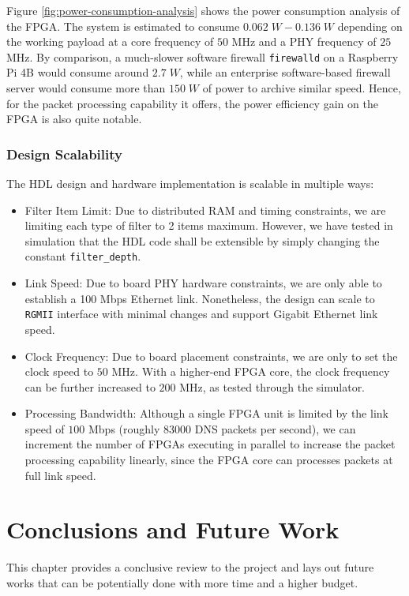 \documentclass[a4paper]{report}
\newcommand{\code}{\texttt}
\begin{document}
Figure \ref{fig:power-consumption-analysis} shows the power consumption analysis of the FPGA. The system is estimated to consume $0.062\;W - 0.136\;W$ depending on the working payload at a core frequency of $50$ MHz and a PHY frequency of $25$ MHz. By comparison, a much-slower software firewall \code{firewalld} on a Raspberry Pi 4B would consume around $2.7 \; W$, while an enterprise software-based firewall server would consume more than $150 \; W$ of power to archive similar speed. Hence, for the packet processing capability it offers, the power efficiency gain on the FPGA is also quite notable.

\subsection{Design Scalability}

The HDL design and hardware implementation is scalable in multiple ways:

\begin{itemize}
    \item Filter Item Limit: Due to distributed RAM and timing constraints, we are limiting each type of filter to 2 items maximum. However, we have tested in simulation that the HDL code shall be extensible by simply changing the constant \code{filter\_depth}.
    \item Link Speed: Due to board PHY hardware constraints, we are only able to establish a 100 Mbps Ethernet link. Nonetheless, the design can scale to \code{RGMII} interface with minimal changes and support Gigabit Ethernet link speed.
    \item Clock Frequency: Due to board placement constraints, we are only to set the clock speed to $50$ MHz. With a higher-end FPGA core, the clock frequency can be further increased to $200$ MHz, as tested through the simulator.
    \item Processing Bandwidth: Although a single FPGA unit is limited by the link speed of $100$ Mbps (roughly $83000$ DNS packets per second), we can increment the number of FPGAs executing in parallel to increase the packet processing capability linearly, since the FPGA core can processes packets at full link speed.
\end{itemize}

\chapter{Conclusions and Future Work}

This chapter provides a conclusive review to the project and lays out future works that can be potentially done with more time and  a higher budget.
\end{document}
